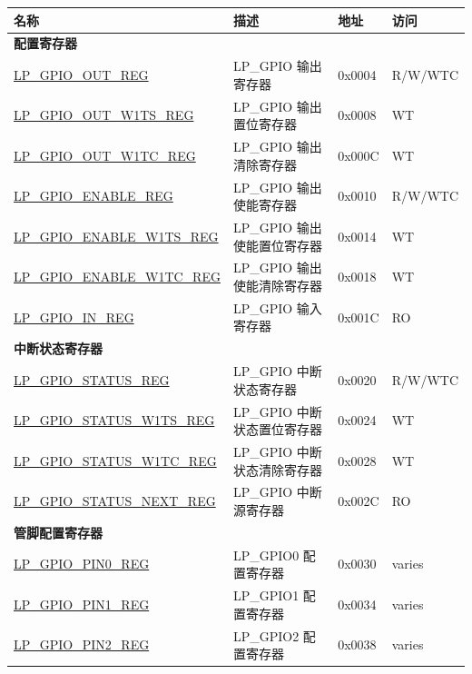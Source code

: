 \begin{longtable}{ | p{6cm} | p{7.2cm} | p{1.3cm} | p{1cm} | }
\hline\rowcolor{lightgray}
\textbf{名称} & \textbf{描述} &  \textbf{地址} & \textbf{访问} \\ \hline
\endhead
\multicolumn{4}{|l|}{\textbf{配置寄存器}} \\ \hline
\hyperref[regdesc:LPGPIOOUTREG]{LP\_GPIO\_OUT\_REG} & LP\_GPIO 输出寄存器 & 0x0004 & R/W/WTC \\ \hline
\hyperref[regdesc:LPGPIOOUTW1TSREG]{LP\_GPIO\_OUT\_W1TS\_REG} & LP\_GPIO 输出置位寄存器 & 0x0008 & WT \\ \hline
\hyperref[regdesc:LPGPIOOUTW1TCREG]{LP\_GPIO\_OUT\_W1TC\_REG} & LP\_GPIO 输出清除寄存器 & 0x000C & WT \\ \hline
\hyperref[regdesc:LPGPIOENABLEREG]{LP\_GPIO\_ENABLE\_REG} & LP\_GPIO 输出使能寄存器 & 0x0010 & R/W/WTC \\ \hline
\hyperref[regdesc:LPGPIOENABLEW1TSREG]{LP\_GPIO\_ENABLE\_W1TS\_REG} & LP\_GPIO 输出使能置位寄存器 & 0x0014 & WT \\ \hline
\hyperref[regdesc:LPGPIOENABLEW1TCREG]{LP\_GPIO\_ENABLE\_W1TC\_REG} & LP\_GPIO 输出使能清除寄存器 & 0x0018 & WT \\ \hline
\hyperref[regdesc:LPGPIOINREG]{LP\_GPIO\_IN\_REG} & LP\_GPIO 输入寄存器 & 0x001C & RO \\ \hline
\multicolumn{4}{|l|}{\textbf{中断状态寄存器}} \\ \hline
\hyperref[regdesc:LPGPIOSTATUSREG]{LP\_GPIO\_STATUS\_REG} & LP\_GPIO 中断状态寄存器 & 0x0020 & R/W/WTC \\ \hline
\hyperref[regdesc:LPGPIOSTATUSW1TSREG]{LP\_GPIO\_STATUS\_W1TS\_REG} & LP\_GPIO 中断状态置位寄存器 & 0x0024 & WT \\ \hline
\hyperref[regdesc:LPGPIOSTATUSW1TCREG]{LP\_GPIO\_STATUS\_W1TC\_REG} & LP\_GPIO 中断状态清除寄存器 & 0x0028 & WT \\ \hline
\hyperref[regdesc:LPGPIOSTATUSNEXTREG]{LP\_GPIO\_STATUS\_NEXT\_REG} & LP\_GPIO 中断源寄存器 & 0x002C & RO \\ \hline
\multicolumn{4}{|l|}{\textbf{管脚配置寄存器}} \\ \hline
\hyperref[regdesc:LPGPIOPINNREG]{LP\_GPIO\_PIN0\_REG} & LP\_GPIO0 配置寄存器 & 0x0030 & varies \\ \hline
\hyperref[regdesc:LPGPIOPINNREG]{LP\_GPIO\_PIN1\_REG} & LP\_GPIO1 配置寄存器 & 0x0034 & varies \\ \hline
\hyperref[regdesc:LPGPIOPINNREG]{LP\_GPIO\_PIN2\_REG} & LP\_GPIO2 配置寄存器 & 0x0038 & varies \\ \hline

\end{longtable}
